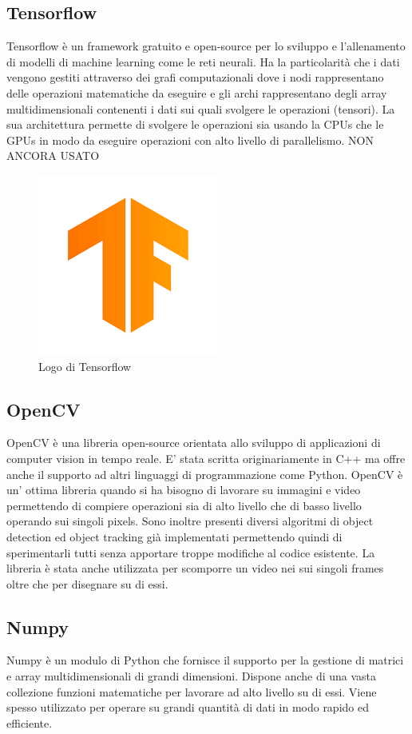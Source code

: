 \subsection{Tensorflow}
Tensorflow è un framework gratuito e open-source per lo sviluppo e l'allenamento di modelli di machine learning come le reti neurali. Ha la particolarità che i dati vengono gestiti attraverso dei grafi computazionali dove i nodi rappresentano delle operazioni matematiche da eseguire e gli archi rappresentano degli array multidimensionali contenenti i dati sui quali svolgere le operazioni (tensori). La sua architettura permette di svolgere le operazioni sia usando la CPUs che le GPUs in modo da eseguire operazioni con alto livello di parallelismo. NON ANCORA USATO
\begin{figure}[H]
	\centering
	\includegraphics[width=0.3\linewidth]{images/logo-tensorflow.png}
	\caption{Logo di Tensorflow}
	\label{Logo di Tensorflow}
\end{figure}
\subsection{OpenCV}
OpenCV è una libreria open-source orientata allo sviluppo di applicazioni di computer vision in tempo reale. E' stata scritta originariamente in C++ ma offre anche il supporto ad altri linguaggi di programmazione come Python. OpenCV è un' ottima libreria quando si ha bisogno di lavorare su immagini e video permettendo di compiere operazioni sia di alto livello che di basso livello operando sui singoli pixels. Sono inoltre presenti diversi algoritmi di object detection ed object tracking già implementati permettendo quindi di sperimentarli tutti senza apportare troppe modifiche al codice esistente. La libreria è stata anche utilizzata per scomporre un video nei sui singoli frames oltre che per disegnare su di essi.
\subsection{Numpy}
Numpy è un modulo di Python che fornisce il supporto per
la gestione di matrici e array multidimensionali di grandi dimensioni. Dispone anche di una vasta collezione funzioni matematiche per lavorare ad alto livello su di essi. Viene spesso utilizzato per operare su grandi quantità di dati in modo rapido ed efficiente.
